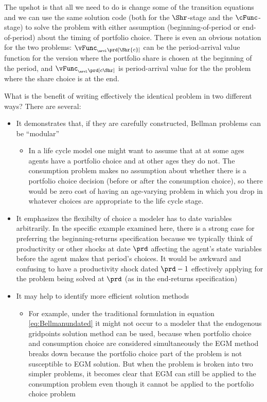 \documentclass[\econtexRoot/SolvingMicroDSOPs]{subfiles}
\begin{document}
The upshot is that all we need to do is change some of the transition equations and we can use the same solution code (both for the $\Shr$-stage and the $\cFunc$-stage) to solve the problem with either assumption (beginning-of-period or end-of-period) about the timing of portfolio choice.  There is even an obvious notation for the two problems: $\vFunc_{_\arvl\prd[\Shr{c}]}$ can be the {period}-arrival value function for the version where the portfolio share is chosen at the beginning of the period, and $\vFunc_{_\arvl\prd[{c}\Shr]}$ is {period}-arrival value for the the problem where the share choice is at the end.

What is the benefit of writing effectively the identical problem in two different ways?  There are several:
\begin{itemize}
\item It demonstrates that, if they are carefully constructed, Bellman problems can be ``modular''
  \begin{itemize}
  \item In a life cycle model one might want to assume that at at some ages agents have a portfolio choice and at other ages they do not. The consumption problem makes no assumption about whether there is a portfolio choice decision (before or after the consumption choice), so there would be zero cost of having an age-varying problem in which you drop in whatever choices are appropriate to the life cycle stage.
  \end{itemize}
\item It emphasizes the flexibilty of choice a modeler has to date variables arbitrarily.  In the specific example examined here, there is a strong case for preferring the beginning-returns specification because we typically think of productivity or other shocks at date $\prd$ affecting the agent's state variables before the agent makes that period's choices.  It would be awkward and confusing to have a productivity shock dated $\prd-1$ effectively applying for the problem being solved at $\prd$ (as in the end-returns specification)
\item It may help to identify more efficient solution methods
  \begin{itemize}
  \item For example, under the traditional formulation in equation \eqref{eq:Bellmanundated} it might not occur to a modeler that the endogenous gridpoints solution method can be used, because when portfolio choice and consumption choice are considered simultaneously the EGM method breaks down because the portfolio choice part of the problem is not susceptible to EGM solution.  But when the problem is broken into two simpler problems, it becomes clear that EGM can still be applied to the consumption problem even though it cannot be applied to the portfolio choice problem
  \end{itemize}
\end{itemize}
\end{document}

